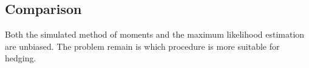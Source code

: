 %
%

\subsection{Comparison}
Both the simulated method of moments and the maximum likelihood estimation are unbiased.
The problem remain is which procedure is more suitable for hedging.

